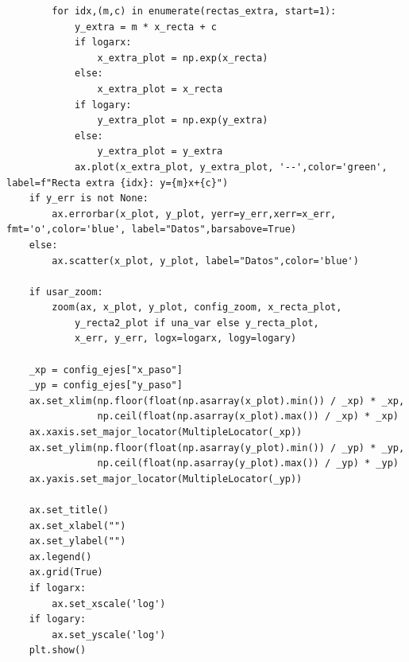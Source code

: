 \documentclass[11pt]{report}
\begin{document}
\begin{enumerate}
\begin{verbatim}
        for idx,(m,c) in enumerate(rectas_extra, start=1):
            y_extra = m * x_recta + c
            if logarx:
                x_extra_plot = np.exp(x_recta)
            else:
                x_extra_plot = x_recta
            if logary:
                y_extra_plot = np.exp(y_extra)
            else:
                y_extra_plot = y_extra
            ax.plot(x_extra_plot, y_extra_plot, '--',color='green', label=f"Recta extra {idx}: y={m}x+{c}")
    if y_err is not None:
        ax.errorbar(x_plot, y_plot, yerr=y_err,xerr=x_err, fmt='o',color='blue', label="Datos",barsabove=True)
    else:
        ax.scatter(x_plot, y_plot, label="Datos",color='blue')

    if usar_zoom:
        zoom(ax, x_plot, y_plot, config_zoom, x_recta_plot,
            y_recta2_plot if una_var else y_recta_plot,
            x_err, y_err, logx=logarx, logy=logary)

    _xp = config_ejes["x_paso"]
    _yp = config_ejes["y_paso"]
    ax.set_xlim(np.floor(float(np.asarray(x_plot).min()) / _xp) * _xp,
                np.ceil(float(np.asarray(x_plot).max()) / _xp) * _xp)
    ax.xaxis.set_major_locator(MultipleLocator(_xp))
    ax.set_ylim(np.floor(float(np.asarray(y_plot).min()) / _yp) * _yp,
                np.ceil(float(np.asarray(y_plot).max()) / _yp) * _yp)
    ax.yaxis.set_major_locator(MultipleLocator(_yp))

    ax.set_title()
    ax.set_xlabel("")
    ax.set_ylabel("")
    ax.legend()
    ax.grid(True)
    if logarx:
        ax.set_xscale('log')
    if logary:
        ax.set_yscale('log')
    plt.show()
\end{verbatim}
\end{enumerate}

\newpage
\nocite{*}
\printbibliography[keyword={parteG},title={Bibliografía General},heading=bibnumbered]
\end{document}
